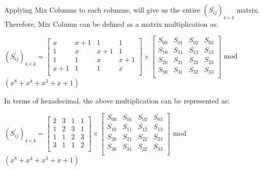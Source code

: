 \documentclass[11pt]{article}
\begin{document}
Applying Mix Columns to each columns, will give us the entire $(S_{ij}^{'})_{4 \times 4}$ matrix. Therefore, Mix Column can be defined as a matrix multiplication as:
\begin{center}
    $
    (S_{ij}^{'})_{4 \times 4} = 
    \begin{bmatrix}
        x & x + 1 & 1 & 1\\
        1 & x & x+1 & 1\\
        1 & 1 & x & x+1\\
        x+1 & 1 & 1 & x\\
    \end{bmatrix}
    \times
    \begin{bmatrix}
        S_{00} & S_{01} & S_{02} & S_{03}\\
        S_{10} & S_{11} & S_{12} & S_{13}\\
        S_{20} & S_{21} & S_{22} & S_{23}\\
        S_{30} & S_{31} & S_{32} & S_{33}\\
    \end{bmatrix}
    $
    mod $(x^8 + x^4 + x^3 + x + 1)$
\end{center}
In terms of hexadecimal, the above multiplication can be represented as:
\begin{center}
    $
    (S_{ij}^{'})_{4 \times 4} = 
    \begin{bmatrix}
        2 & 3 & 1 & 1\\
        1 & 2 & 3 & 1\\
        1 & 1 & 2 & 3\\
        3 & 1 & 1 & 2\\
    \end{bmatrix}
    \times
    \begin{bmatrix}
        S_{00} & S_{01} & S_{02} & S_{03}\\
        S_{10} & S_{11} & S_{12} & S_{13}\\
        S_{20} & S_{21} & S_{22} & S_{23}\\
        S_{30} & S_{31} & S_{32} & S_{33}\\
    \end{bmatrix}
    $
    mod $(x^8 + x^4 + x^3 + x + 1)$
\end{center}
\end{document}
